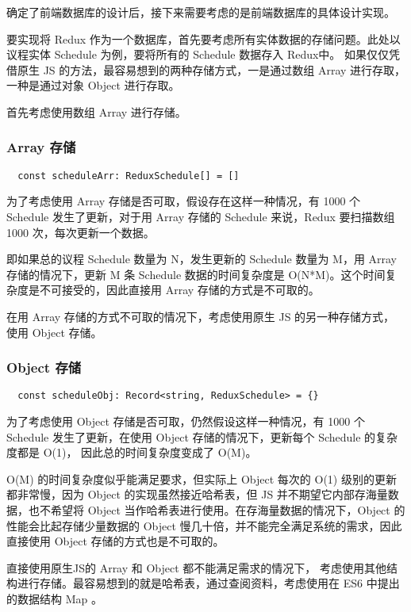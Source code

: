 确定了前端数据库的设计后，接下来需要考虑的是前端数据库的具体设计实现。

要实现将 Redux 作为一个数据库，首先要考虑所有实体数据的存储问题。此处以议程实体 Schedule 为例，要将所有的 Schedule 数据存入 Redux中。 如果仅仅凭借原生 JS 的方法，最容易想到的两种存储方式，一是通过数组 Array 进行存取，一种是通过对象 Object 进行存取。

首先考虑使用数组 Array 进行存储。

\subsubsection{Array 存储}

{\setmainfont{Courier New Bold}
\begin{lstlisting}
  const scheduleArr: ReduxSchedule[] = []
 \end{lstlisting}}
为了考虑使用 Array 存储是否可取，假设存在这样一种情况，有 1000 个 Schedule 发生了更新，对于用 Array 存储的 Schedule 来说，Redux 要扫描数组 1000 次，每次更新一个数据。

即如果总的议程 Schedule 数量为 N，发生更新的 Schedule 数量为 M，用 Array 存储的情况下，更新 M 条 Schedule 数据的时间复杂度是 O(N*M)。这个时间复杂度是不可接受的，因此直接用 Array 存储的方式是不可取的。

在用 Array 存储的方式不可取的情况下，考虑使用原生 JS 的另一种存储方式， 使用 Object 存储。

\subsubsection{Object 存储}

{\setmainfont{Courier New Bold}
\begin{lstlisting}
  const scheduleObj: Record<string, ReduxSchedule> = {}
 \end{lstlisting}}
为了考虑使用 Object 存储是否可取，仍然假设这样一种情况，有 1000 个 Schedule 发生了更新，在使用 Object 存储的情况下，更新每个 Schedule 的复杂度都是 O(1)， 因此总的时间复杂度变成了 O(M)。

O(M) 的时间复杂度似乎能满足要求，但实际上 Object 每次的 O(1) 级别的更新都非常慢，因为 Object 的实现虽然接近哈希表，但 JS 并不期望它内部存海量数据，也不希望将 Object 当作哈希表进行使用。在存海量数据的情况下，Object 的性能会比起存储少量数据的 Object 慢几十倍，并不能完全满足系统的需求，因此直接使用 Object 存储的方式也是不可取的。


直接使用原生JS的 Array 和 Object 都不能满足需求的情况下， 考虑使用其他结构进行存储。最容易想到的就是哈希表，通过查阅资料，考虑使用在 ES6 中提出的数据结构 Map 。

